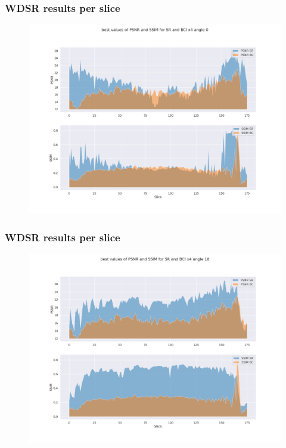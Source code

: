 \documentclass{beamer}
\begin{document}
\begin{frame}
\frametitle{WDSR results per slice  }
   \begin{figure}
  \includegraphics[scale=0.22]{images/PSNR-SSIM_sr-bc_x4_000.png}
 \end{figure}
\end{frame}

\begin{frame}
\frametitle{WDSR results per slice}
   \begin{figure}
  \includegraphics[scale=0.22]{images/PSNR-SSIM_sr-bc_x4_018.png}
 \end{figure}
\end{frame}
\end{document}
